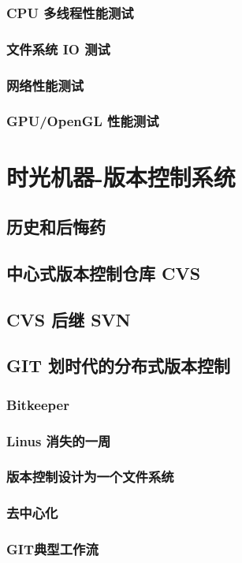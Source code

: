 \documentclass[amstex,twoside]{ctexbook}
\begin{document}
\subsection{  CPU 多线程性能测试}
\subsection{  文件系统 IO 测试}
\subsection{  网络性能测试}
\subsection{  GPU/OpenGL 性能测试}


\chapter{时光机器-版本控制系统}
\section{   历史和后悔药	}
\section{   中心式版本控制仓库 CVS	}
\section{   CVS 后继 SVN	}
\section{   GIT 划时代的分布式版本控制	}
\subsection{  Bitkeeper	}
\subsection{  Linus 消失的一周	}
\subsection{  版本控制设计为一个文件系统	}
\subsection{ 去中心化	}
\subsection{  GIT典型工作流	}
\end{document}

